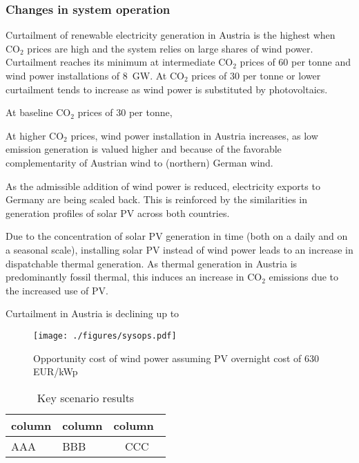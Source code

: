 \documentclass[review, 3p, times]{elsarticle} %
\newcommand{\COO}{\ensuremath{\mathrm{CO_2}} }
\begin{document}
    \subsubsection{Changes in system operation}
    Curtailment of renewable electricity generation in Austria is the highest when \COO prices are high and the system
    relies on large shares of wind power.
    Curtailment reaches its minimum at intermediate \COO prices of $60$ \EUR per tonne and wind power installations of
    \SI{8}{\giga\watt}.
    At \COO prices of $30$ \EUR per tonne or lower curtailment tends to increase as wind power is substituted by
    photovoltaics.


    At baseline \COO prices of $30$ \EUR per tonne,

    At higher \COO prices, wind power installation in Austria increases, as low emission generation is valued higher
    and because of the favorable complementarity of Austrian wind to (northern) German wind.


    As the admissible addition of wind power is reduced, electricity exports to Germany are being scaled back.
    This is reinforced by the similarities in generation profiles of solar PV across both countries.

    Due to the concentration of solar PV generation in time (both on a daily and on a seasonal scale), installing solar
    PV instead of wind power leads to an increase in dispatchable thermal generation.
    As thermal generation in Austria is predominantly fossil thermal, this induces an increase in \COO emissions due
    to the increased use of PV\@.

    Curtailment in Austria is declining up to

    \begin{figure*}
        \centering
        \texttt{[image: ./figures/sysops.pdf]}
        \caption{Opportunity cost of wind power assuming PV overnight cost of 630 EUR/kWp}
        \label{figure:system-operation-base}
    \end{figure*}


    \begin{table}
        \centering
        \caption{Key scenario results}
        \begin{tabulary}{\textwidth}{LLC}
            \toprule
            column & column & column \\
\midrule
AAA & BBB & CCC \\
\bottomrule
\end{tabulary}
\end{table}
\end{document}
